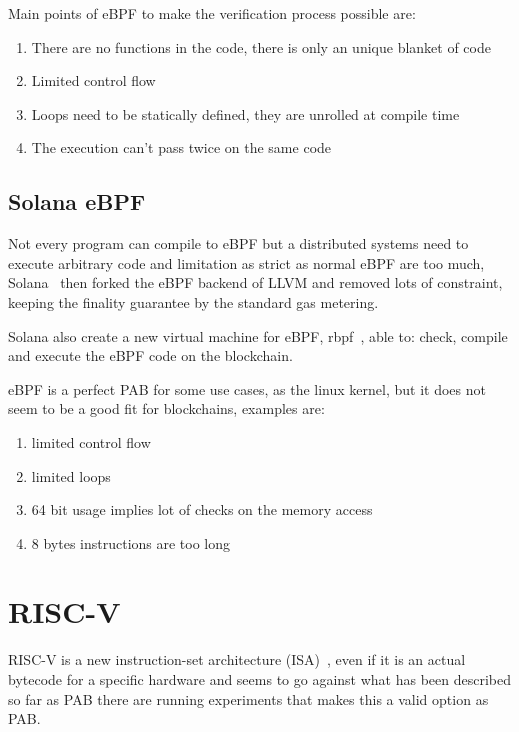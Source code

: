 Main points of eBPF to make the verification process possible are:
\begin{enumerate}
  \item There are no functions in the code, there is only an unique blanket of code
  \item Limited control flow
  \item Loops need to be statically defined, they are unrolled at compile time
  \item The execution can't pass twice on the same code
\end{enumerate}

\subsection{Solana eBPF}

Not every program can compile to eBPF but a distributed systems need to execute arbitrary code and limitation as strict as normal eBPF are too much, Solana~\cite{yakovenko2018solana} then forked the eBPF backend of LLVM and removed lots of constraint, keeping the finality guarantee by the standard gas metering.~\cite{ebpf-contracts}

Solana also create a new virtual machine for eBPF, rbpf~\cite{rbpf}, able to: check, compile and execute the eBPF code on the blockchain.

eBPF is a perfect PAB for some use cases, as the linux kernel, but it does not seem to be a good fit for blockchains, examples are:
\begin{enumerate}
  \item limited control flow
  \item limited loops
  \item 64 bit usage implies lot of checks on the memory access
  \item 8 bytes instructions are too long
\end{enumerate}

\section{RISC-V}

RISC-V is a new instruction-set architecture (ISA)~\cite{risc-v-spec}, even if it is an actual bytecode for a specific hardware and seems to go against what has been described so far as PAB there are running experiments that makes this a valid option as PAB.

